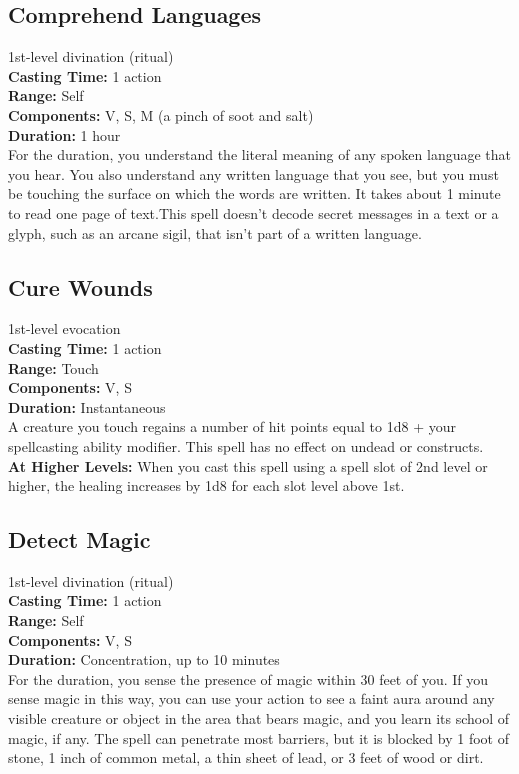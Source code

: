 \documentclass[11pt, A4paper, english]{article}
\begin{document}
		\subsection{Comprehend Languages}
1st-level divination (ritual) \\
\textbf{Casting Time:} 1 action \\
\textbf{Range:} Self \\
\textbf{Components:} V, S, M (a pinch of soot and salt) \\
\textbf{Duration:} 1 hour \\
For the duration, you understand the literal meaning of any spoken language that you hear. You also understand any written language that you see, but you must be touching the surface on which the words are written. It takes about 1  minute to read one page of text.This spell doesn’t decode secret messages in a text or a glyph, such as an arcane sigil, that isn’t part of a written language.

		\subsection{Cure Wounds}
1st-level evocation \\
\textbf{Casting Time:} 1 action \\
\textbf{Range:} Touch \\
\textbf{Components:} V, S \\
\textbf{Duration:} Instantaneous \\
A creature you touch regains a number of hit points equal to 1d8 + your spellcasting ability modifier. This spell has no effect on undead or constructs. \\
\textbf{At Higher Levels:} When you cast this spell using a spell slot of 2nd level or higher, the healing increases by 1d8 for each slot level above 1st.

		\subsection{Detect Magic}
1st-level divination (ritual) \\
\textbf{Casting Time:} 1 action \\
\textbf{Range:} Self \\
\textbf{Components:} V, S \\
\textbf{Duration:} Concentration, up to 10 minutes \\
For the duration, you sense the presence of magic within 30 feet of you. If you sense magic in this way, you can use your action to see a faint aura around any visible creature or object in the area that bears magic, and you learn its school of magic, if any. The spell can penetrate most barriers, but it is blocked by 1  foot of stone, 1 inch of common metal, a thin sheet of lead, or 3 feet of wood or dirt.
\end{document}

